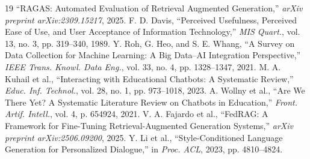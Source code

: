 \documentclass[conference]{IEEEtran}
\begin{document}
\begin{thebibliography}{19}
``RAGAS: Automated Evaluation of Retrieval Augmented Generation,''
\textit{arXiv preprint arXiv:2309.15217}, 2025.
F. D. Davis, ``Perceived Usefulness, Perceived Ease of Use, and User
Acceptance of Information Technology,'' \textit{MIS Quart.}, vol. 13,
no. 3, pp. 319--340, 1989.
Y. Roh, G. Heo, and S. E. Whang, ``A Survey on Data Collection for
Machine Learning: A Big Data--AI Integration Perspective,''
\textit{IEEE Trans. Knowl. Data Eng.}, vol. 33, no. 4,
pp. 1328--1347, 2021.
M. A. Kuhail et al., ``Interacting with Educational Chatbots: A
Systematic Review,'' \textit{Educ. Inf. Technol.}, vol. 28, no. 1,
pp. 973--1018, 2023.
A. Wollny et al., ``Are We There Yet? A Systematic Literature Review on
Chatbots in Education,'' \textit{Front. Artif. Intell.}, vol. 4,
p. 654924, 2021.
V. A. Fajardo et al., ``FedRAG: A Framework for Fine-Tuning
Retrieval-Augmented Generation Systems,''
\textit{arXiv preprint arXiv:2506.09200}, 2025.
Y. Li et al., ``Style-Conditioned Language Generation for Personalized
Dialogue,'' in \textit{Proc. ACL}, 2023, pp. 4810--4824.
\end{thebibliography}
\end{document}
